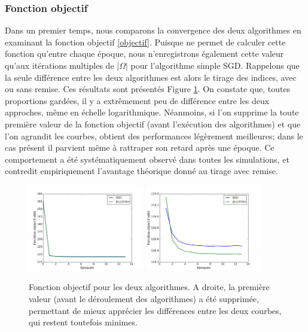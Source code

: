 \documentclass[10pt,a4paper]{article}
\begin{document}
\subsubsection*{Fonction objectif}
Dans un premier temps, nous comparons la convergence des deux algorithmes en examinant la fonction objectif \eqref{objectif}. Puisque \jel ne permet de calculer cette fonction qu'entre chaque époque, nous n'enregistrons également cette valeur qu'aux itérations multiples de $|\Omega|$ pour l'algorithme simple SGD. Rappelons que la seule différence entre les deux algorithmes est alors le tirage des indices, avec ou sans remise. Ces résultats sont présentés Figure \ref{obj_samp}. On constate que, toutes proportions gardées, il y a extrêmement peu de différence entre les deux approches, même en échelle logarithmique. Néanmoins, si l'on supprime la toute première valeur de la fonction objectif (avant l'exécution des algorithmes) et que l'on agrandit les courbes, \jel obtient des performances légèrement meilleures; dans le cas présent il parvient même à rattraper son retard après une époque. Ce comportement a été systématiquement observé dans toutes les simulations, et contredit empiriquement l'avantage théorique donné au tirage avec remise.

\begin{figure}[h]
\centering
\includegraphics[width=0.45\textwidth]{fig/obj_samp1}
\includegraphics[width=0.45\textwidth]{fig/obj_samp2}
\caption{Fonction objectif pour les deux algorithmes. A droite, la première valeur (avant le déroulement des algorithmes) a été supprimée, permettant de mieux apprécier les différences entre les deux courbes, qui restent toutefois minimes.}
\label{obj_samp}
\end{figure}
\end{document}
